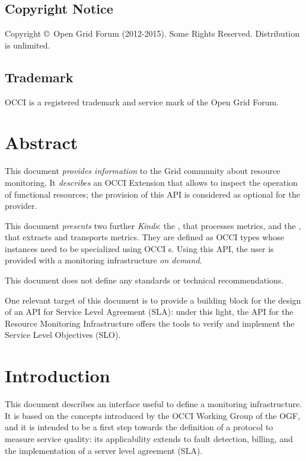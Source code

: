 \documentclass[10pt]{article}  %
\newcommand{\copyrightyears}{2012-2015}  %
\begin{document}
\subsection*{Copyright Notice}

Copyright \copyright \ Open Grid Forum (\copyrightyears).  Some Rights Reserved.  
Distribution is unlimited.

\subsection*{Trademark}

OCCI is a registered trademark and service mark of the Open Grid Forum. 

\section*{Abstract}

This document {\em provides information} to the Grid community about resource monitoring. It {\em describes} an OCCI Extension that allows to inspect the operation of functional resources; the provision of this API is considered as optional for the provider.

This document {\em presents} two further {\em Kinds}: the \sens, that processes metrics, and the \coll, that extracts and transports metrics. They are defined as OCCI types whose instances need to be specialized using OCCI \mi s. Using this API, the user is provided with a monitoring infrastructure {\em on demand}.

This document does not define any standards or technical recommendations.

One relevant target of this document is to provide a building block for the design of an API for Service Level Agreement (SLA): under this light, the API for the Resource Monitoring Infrastructure offers the tools to verify and implement the Service Level Objectives (SLO).

\tableofcontents

\newpage

\section{Introduction}

This document describes an interface useful to define a monitoring infrastructure. It is based on the concepts introduced by the OCCI Working Group of the OGF, and it is intended to be a first step towards the definition of a protocol to measure service quality: its applicability extends to fault detection, billing, and the implementation of a server level agreement (SLA).
\end{document}

